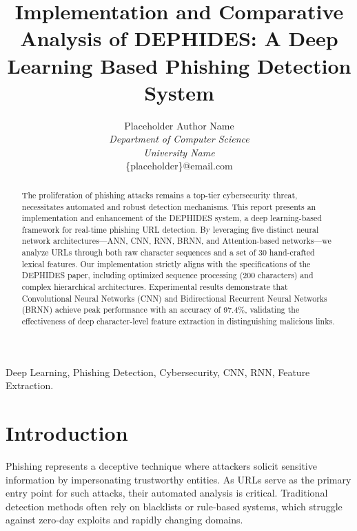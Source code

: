 \documentclass[journal,twocolumn]{IEEEtran}
\begin{document}
\title{Implementation and Comparative Analysis of DEPHIDES: A Deep Learning Based Phishing Detection System}

\author{Placeholder Author Name \\
\textit{Department of Computer Science} \\
\textit{University Name} \\
\{placeholder\}@email.com}

\maketitle

\begin{abstract}
The proliferation of phishing attacks remains a top-tier cybersecurity threat, necessitates automated and robust detection mechanisms. This report presents an implementation and enhancement of the DEPHIDES system, a deep learning-based framework for real-time phishing URL detection. By leveraging five distinct neural network architectures---ANN, CNN, RNN, BRNN, and Attention-based networks---we analyze URLs through both raw character sequences and a set of 30 hand-crafted lexical features. Our implementation strictly aligns with the specifications of the DEPHIDES paper, including optimized sequence processing (200 characters) and complex hierarchical architectures. Experimental results demonstrate that Convolutional Neural Networks (CNN) and Bidirectional Recurrent Neural Networks (BRNN) achieve peak performance with an accuracy of 97.4\%, validating the effectiveness of deep character-level feature extraction in distinguishing malicious links.
\end{abstract}

\begin{IEEEkeywords}
Deep Learning, Phishing Detection, Cybersecurity, CNN, RNN, Feature Extraction.
\end{IEEEkeywords}

\section{Introduction}
Phishing represents a deceptive technique where attackers solicit sensitive information by impersonating trustworthy entities. As URLs serve as the primary entry point for such attacks, their automated analysis is critical. Traditional detection methods often rely on blacklists or rule-based systems, which struggle against zero-day exploits and rapidly changing domains. 
\end{document}
